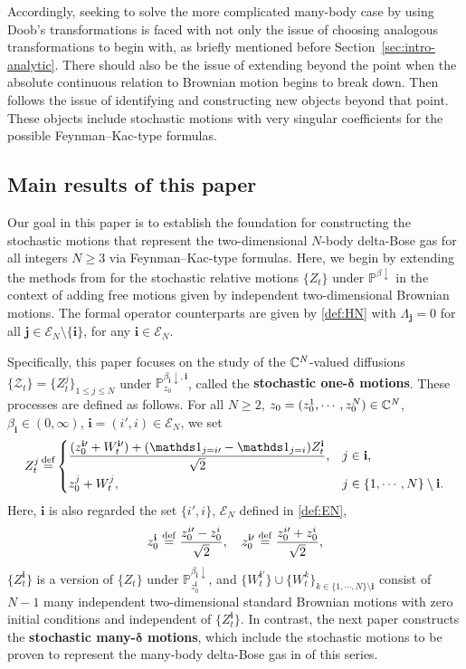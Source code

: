 \documentclass[12pt, twoside]{article}
\numberwithin{figure}{section}
\newcommand{\1}{\mathds 1}
\newcommand{\da}{{\downarrow}}
\newcommand{\bs}{\boldsymbol}
\newcommand{\ms}{\mathscr}
\renewcommand{\P}{{\mathbb P}}
\newcommand{\mc}{\mathcal}
\newcommand{\2}{{\mathbf 1}}
\newcommand{\defeq}{{\stackrel{\rm def}{=}}}
\newcommand{\bi}{\mathbf i}
\newcommand{\bj}{\mathbf j}
\newcommand{\two}{{\sqrt{2}}}
\newcommand{\CN}{{\mathbb C}^{\it N}}
\begin{document}
Accordingly, seeking to solve the more complicated many-body case by using Doob's transformations is faced with not only the issue of choosing analogous transformations to begin with, as briefly mentioned before Section~\ref{sec:intro-analytic}. There should also be the issue of extending beyond the point when the absolute continuous relation to Brownian motion begins to break down. Then follows the issue of identifying and constructing new objects beyond that point. These objects include stochastic motions with very singular coefficients for the possible Feynman--Kac-type formulas.

\subsection{Main results of this paper}\label{sec:intro-main}
Our goal in this paper is to establish the foundation for constructing the stochastic motions that represent the two-dimensional $N$-body delta-Bose gas for all integers $N\geq 3$ via Feynman--Kac-type formulas. Here, we begin by extending the methods from \cite{C:BES} for the stochastic relative motions $\{Z_t\}$ under $\P^{\beta\da}$ in the context of adding free motions given by independent two-dimensional Brownian motions. The formal operator counterparts are given by \eqref{def:HN} with $\Lambda_\bj=0$ for all $\bj\in \mathcal E_N\setminus\{\bi\}$, for any $\bi\in \mc E_N$. 



Specifically, this paper focuses on the study of the $\CN$-valued diffusions $\{\ms Z_t\}=\{Z^j_t\}_{1\leq j\leq N}$ under $\P_{z_0}^{\beta_\bi\da,\bi}$, called the {\bf stochastic one-$\bs \delta$ motions}. These processes are defined as follows. 
For all $N\geq 2$,  $z_0=(z_0^1,\cdots,z_0^N)\in \CN$, $\beta_\bi\in (0,\infty)$, $\bi=(i\prime,i)\in \mc E_N$, we set
\begin{align}\label{def:SDE2}
Z^j_t\,\defeq
\begin{cases}
\displaystyle \frac{(z^{\bi\prime}_0+W^{\bi\prime}_t)+(\1_{j=i\prime}-\1_{j=i})Z^\bi_t}{\two},&j\in \bi,\\
\vspace{-.4cm}\\
z^j_0+W^j_t,&j\in \{1,\cdots,N\}\setminus \bi.
\end{cases}
\end{align}
Here, $\bi$ is also regarded the set $\{i\prime,i\}$, $\mathcal E_N$ defined in \eqref{def:EN}, 
\begin{align}\label{def:unitary}
z_0^{\bi}\;\defeq\; \frac{z_0^{i\prime}-z_0^{i}}{\two},\quad 
z_0^{\bi\prime}\;\defeq\; \frac{z_0^{i\prime}+z_0^{i}}{\two},
\end{align}
$\{Z^\bi_t\}$ is a version of 
$\{Z_t\}$ under $\P^{\beta_\bi\da}_{z_0^\bi}$, and  $\{W^{\bi\prime}_t\}\cup \{W^k_t\}_{k\in \{1,\cdots,N\}\setminus\bi}$ consist of 
$N-1$ many independent two-dimensional standard Brownian motions with zero initial conditions and independent of $\{Z^\bi_t\}$. In contrast, the next paper \cite{C:SDBG2} constructs the {\bf stochastic many-$\bs \delta$ motions}, which include the stochastic motions to be proven to represent the many-body delta-Bose gas in \cite{C:SDBG3} of this series.
\end{document}
